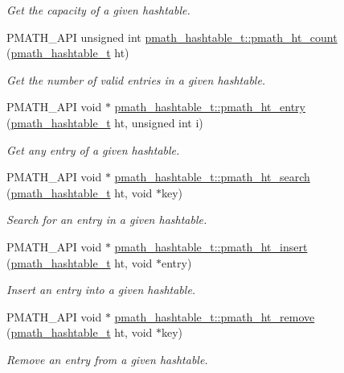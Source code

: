\begin{CompactItemize}
\begin{CompactList}\small\item\em Get the capacity of a given hashtable. \item\end{CompactList}\item 
PMATH\_\-API unsigned int \hyperlink{group__hashtables_gf42cb622735f861185f056de654d3632}{pmath\_\-hashtable\_\-t::pmath\_\-ht\_\-count} (\hyperlink{classpmath__hashtable__t}{pmath\_\-hashtable\_\-t} ht)
\begin{CompactList}\small\item\em Get the number of valid entries in a given hashtable. \item\end{CompactList}\item 
PMATH\_\-API void $\ast$ \hyperlink{group__hashtables_gd3f57058604e14d27b61a0282c02be87}{pmath\_\-hashtable\_\-t::pmath\_\-ht\_\-entry} (\hyperlink{classpmath__hashtable__t}{pmath\_\-hashtable\_\-t} ht, unsigned int i)
\begin{CompactList}\small\item\em Get any entry of a given hashtable. \item\end{CompactList}\item 
PMATH\_\-API void $\ast$ \hyperlink{group__hashtables_g94ad66bd7413d8237fa3f58ef8e944a1}{pmath\_\-hashtable\_\-t::pmath\_\-ht\_\-search} (\hyperlink{classpmath__hashtable__t}{pmath\_\-hashtable\_\-t} ht, void $\ast$key)
\begin{CompactList}\small\item\em Search for an entry in a given hashtable. \item\end{CompactList}\item 
PMATH\_\-API void $\ast$ \hyperlink{group__hashtables_ged2c72c01c0c883154d77ddb6f42dd05}{pmath\_\-hashtable\_\-t::pmath\_\-ht\_\-insert} (\hyperlink{classpmath__hashtable__t}{pmath\_\-hashtable\_\-t} ht, void $\ast$entry)
\begin{CompactList}\small\item\em Insert an entry into a given hashtable. \item\end{CompactList}\item 
PMATH\_\-API void $\ast$ \hyperlink{group__hashtables_gc0825f215931052b62d62abd574e0047}{pmath\_\-hashtable\_\-t::pmath\_\-ht\_\-remove} (\hyperlink{classpmath__hashtable__t}{pmath\_\-hashtable\_\-t} ht, void $\ast$key)
\begin{CompactList}\small\item\em Remove an entry from a given hashtable. \item\end{CompactList}\end{CompactItemize}


